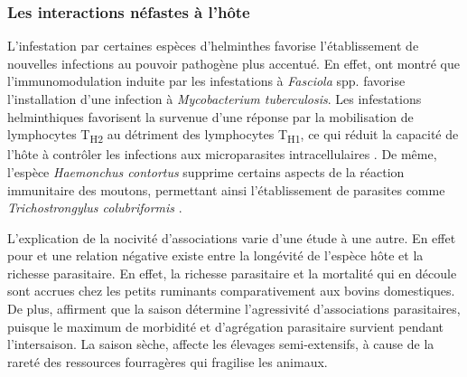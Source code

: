 \subsubsection{Les interactions néfastes à l'hôte}
L'infestation par certaines espèces d'helminthes favorise l'établissement de nouvelles 
infections au pouvoir pathogène plus accentué. En effet,  ont montré 
que l'immunomodulation induite par les infestations à \textit{Fasciola} spp. favorise 
l'installation d'une infection à \textit{Mycobacterium tuberculosis}. Les infestations 
helminthiques favorisent la survenue d'une réponse par la mobilisation de lymphocytes 
T\textsubscript{H2} au détriment des lymphocytes T\textsubscript{H1}, ce qui réduit 
la capacité de l'hôte à contrôler les infections aux microparasites intracellulaires 
. De même, l'espèce \textit{Haemonchus contortus} supprime 
certains aspects de la réaction immunitaire des moutons, permettant ainsi l'établissement 
de parasites comme \textit{Trichostrongylus colubriformis} .
\par L'explication de la nocivité d'associations varie d'une étude à une autre. 
En effet pour  et  une relation négative existe 
entre la longévité de l'espèce hôte et la richesse parasitaire. En effet, la 
richesse parasitaire et la mortalité qui en découle sont accrues chez les petits 
ruminants comparativement aux bovins domestiques. De plus,  
affirment que la saison détermine l'agressivité d'associations parasitaires, 
puisque le maximum de morbidité et d'agrégation parasitaire survient pendant 
l'intersaison. La saison sèche, affecte les élevages semi-extensifs, à cause de 
la rareté des ressources fourragères qui fragilise les animaux.
